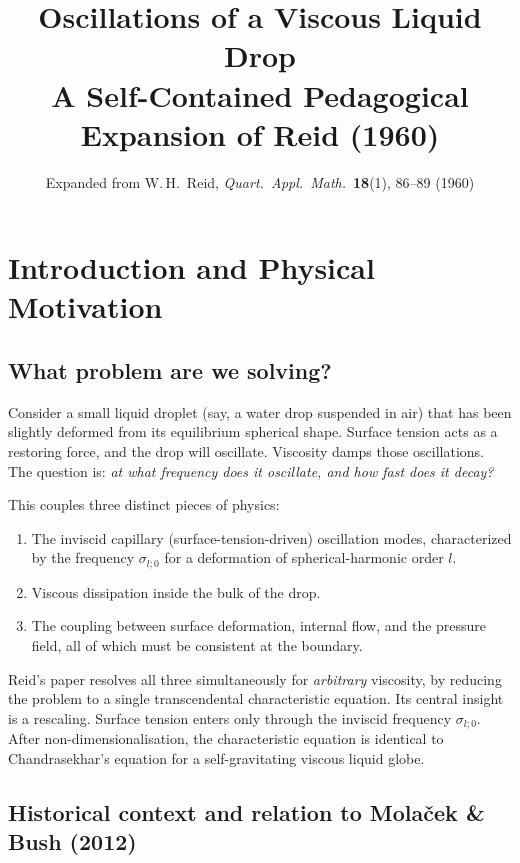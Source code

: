 \documentclass[12pt]{article}
\title{\textbf{Oscillations of a Viscous Liquid Drop}\\[6pt]
       \large A Self-Contained Pedagogical Expansion of Reid (1960)}
\author{Expanded from W.\,H.\ Reid, \emph{Quart.\ Appl.\ Math.}\ \textbf{18}(1), 86--89 (1960)}
\date{}
\theoremstyle{definition}
\begin{document}
\maketitle
\tableofcontents
\bigskip

\section{Introduction and Physical Motivation}

\subsection{What problem are we solving?}

Consider a small liquid droplet (say, a water drop suspended in air) that has been
slightly deformed from its equilibrium spherical shape. Surface tension acts as a
restoring force, and the drop will oscillate. Viscosity damps those oscillations. The
question is: \emph{at what frequency does it oscillate, and how fast does it decay?}

This couples three distinct pieces of physics:
\begin{enumerate}
  \item The inviscid capillary (surface-tension-driven) oscillation modes, characterized
        by the frequency $\sigma_{l;0}$ for a deformation of spherical-harmonic order $l$.
  \item Viscous dissipation inside the bulk of the drop.
  \item The coupling between surface deformation, internal flow, and the pressure
        field, all of which must be consistent at the boundary.
\end{enumerate}

Reid's paper resolves all three simultaneously for \emph{arbitrary} viscosity, by reducing
the problem to a single transcendental characteristic equation. Its central insight is a rescaling. Surface tension enters only through the inviscid
frequency $\sigma_{l;0}$. After non-dimensionalisation, the characteristic equation is
identical to Chandrasekhar's equation for a self-gravitating viscous liquid globe.

\subsection{Historical context and relation to Mola\v{c}ek \& Bush (2012)}
\end{document}

